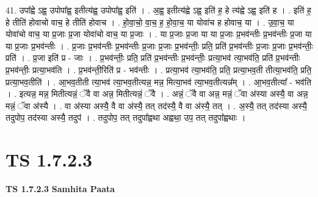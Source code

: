 \documentclass[17pt]{extarticle}
\begin{document}
41. उपा᳚ह्वे ऽह्व॒ उपोपा᳚ह्व॒ इतीत्य॑ह्व॒ उपोपा᳚ह्व॒ इति॑ । . अ॒ह्व॒ इतीत्य॑ह्वे ऽह्व॒ इति॑ ह॒ हे त्य॑ह्वे ऽह्व॒ इति॑ ह । . इति॑ ह॒ हे तीति॑ होवाचो वाच॒ हे तीति॑ होवाच । . हो॒वा॒चो॒ वा॒च॒ ह॒ हो॒वा॒च॒ या योवा॑च ह होवाच॒ या । . उ॒वा॒च॒ या योवा॑चो वाच॒ या प्र॒जाः प्र॒जा योवा॑चो वाच॒ या प्र॒जाः । . या प्र॒जाः प्र॒जा या या प्र॒जाः प्र॒भव॑न्तीः प्र॒भव॑न्तीः प्र॒जा या या प्र॒जाः प्र॒भव॑न्तीः । . प्र॒जाः प्र॒भव॑न्तीः प्र॒भव॑न्तीः प्र॒जाः प्र॒जाः प्र॒भव॑न्तीः॒ प्रति॒ प्रति॑ प्र॒भव॑न्तीः प्र॒जाः प्र॒जाः प्र॒भव॑न्तीः॒ प्रति॑ । . प्र॒जा इति॑ प्र - जाः । . प्र॒भव॑न्तीः॒ प्रति॒ प्रति॑ प्र॒भव॑न्तीः प्र॒भव॑न्तीः॒ प्रत्या॒भव॑ त्या॒भव॑ति॒ प्रति॑ प्र॒भव॑न्तीः प्र॒भव॑न्तीः॒ प्रत्या॒भव॑ति । . प्र॒भव॑न्ती॒रिति॑ प्र - भव॑न्तीः । . प्रत्या॒भव॑ त्या॒भव॑ति॒ प्रति॒ प्रत्या॒भव॒ती तीत्या॒भव॑ति॒ प्रति॒ प्रत्या॒भव॒तीति॑ । . आ॒भव॒तीती त्या॒भव॑ त्या॒भव॒तीत्यन्न॒ मन्न॒ मित्या॒भव॑ त्या॒भव॒तीत्यन्न᳚म् । . आ॒भव॒तीत्या᳚ - भव॑ति । . इत्यन्न॒ मन्न॒ मितीत्यन्नं॒ ॅवै वा अन्न॒ मितीत्यन्नं॒ ॅवै । . अन्नं॒ ॅवै वा अन्न॒ मन्नं॒ ॅवा अ॑स्या अस्यै॒ वा अन्न॒ मन्नं॒ ॅवा अ॑स्यै । . वा अ॑स्या अस्यै॒ वै वा अ॑स्यै॒ तत् तद॑स्यै॒ वै वा अ॑स्यै॒ तत् । . अ॒स्यै॒ तत् तद॑स्या अस्यै॒ तदुपोप॒ तद॑स्या अस्यै॒ तदुप॑ । . तदुपोप॒ तत् तदुपा᳚ह्वथा अह्वथा॒ उप॒ तत् तदुपा᳚ह्वथाः । \newline
\pagebreak
{}
\section*{ TS 1.7.2.3 }

\textbf{TS 1.7.2.3 } \newline
\textbf{Samhita Paata} \newline
\end{document}
